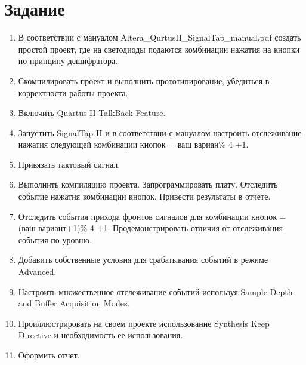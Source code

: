 \documentclass[a4paper,14pt]{article}
\begin{document}
	
	\tableofcontents
	\pagebreak
	\section{Задание}
	
	\begin{enumerate}
		\item В соответствии с мануалом Altera\_QurtusII\_SignalTap\_manual.pdf создать простой проект, где на светодиоды подаются комбинации нажатия на кнопки по принципу дешифратора.
		
		\item Скомпилировать проект и выполнить прототипирование, убедиться в корректности работы проекта.
		
		\item Включить Quartus II TalkBack Feature.
		
		\item Запустить SignalTap II и в соответствии с мануалом настроить отслеживание нажатия следующей комбинации кнопок = ваш вариан\% 4 +1.
		
		\item Привязать тактовый сигнал.
		
		\item Выполнить компиляцию проекта. Запрограммировать плату. Отследить событие нажатия комбинации кнопок. Привести результаты в отчете.
		
		\item Отследить события прихода фронтов сигналов для комбинации кнопок = (ваш вариант+1)\% 4 +1. Продемонстрировать отличия от отслеживания события по уровню.
		
		\item Добавить собственные условия для срабатывания событий в режиме Advanced.
			
		\item Настроить множественное отслеживание событий используя Sample Depth and Buffer Acquisition Modes.
		
		\item Проиллюстрировать на своем проекте использование Synthesis Keep Directive и необходимость ее использования.
		
		\item Оформить отчет.
		
	\end{enumerate}

	
\end{document}
